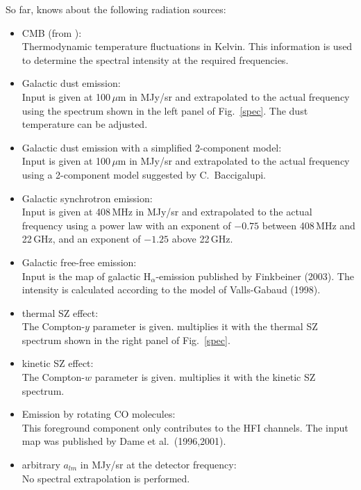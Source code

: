 So far,  knows about the following radiation sources:
\begin{itemize}
 \item CMB (from ):\\
   Thermodynamic temperature fluctuations in Kelvin. This information is used
   to determine the spectral intensity at the required frequencies.
 \item Galactic dust emission:\\
   Input is given at 100$\,\mu$m in MJy/sr and extrapolated to the actual
   frequency using the spectrum shown in the left panel of Fig.~\ref{spec}.
   The dust temperature can be adjusted.
 \item Galactic dust emission with a simplified 2-component model:\\
   Input is given at 100$\,\mu$m in MJy/sr and extrapolated to the actual
   frequency using a 2-component model suggested by C.~Baccigalupi.
 \item Galactic synchrotron emission:\\
   Input is given at 408$\,$MHz in MJy/sr and extrapolated to the actual
   frequency using a power law with an exponent of $-0.75$ between 408$\,$MHz
   and 22$\,$GHz, and an exponent of $-1.25$ above 22$\,$GHz.
 \item Galactic free-free emission: \\
   Input is the map of galactic H$_{\alpha}$-emission published by
   Finkbeiner (2003). The intensity is calculated according to the model of
   Valls-Gabaud (1998).
 \item thermal SZ effect:\\
   The Compton-$y$ parameter is given.
    multiplies it with the thermal SZ spectrum
   shown in the right panel of Fig.~\ref{spec}.
 \item kinetic SZ effect:\\
   The Compton-$w$ parameter is given.
    multiplies it with the kinetic SZ spectrum.
 \item Emission by rotating CO molecules:\\
   This foreground component only contributes to the HFI channels.
   The input map was published by Dame et al.\ (1996,2001).
 \item arbitrary $a_{lm}$ in MJy/sr at the detector frequency:\\
   No spectral extrapolation is performed.
\end{itemize}

